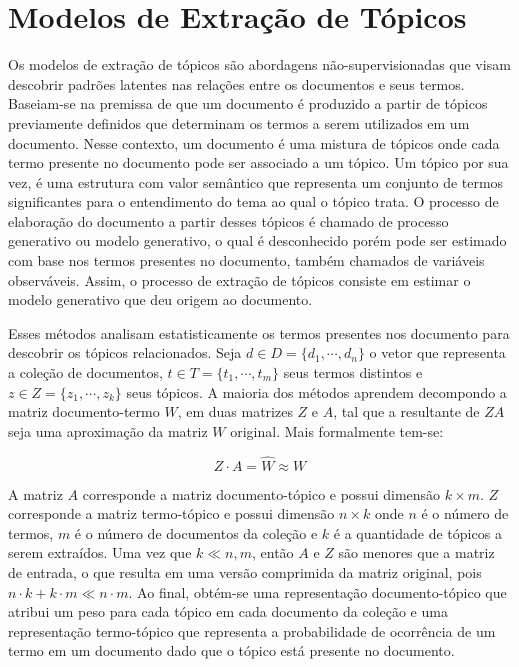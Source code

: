 \section{Modelos de Extração de Tópicos}



Os modelos de extração de tópicos são abordagens não-supervisionadas que visam descobrir padrões latentes nas relações entre os documentos e seus termos.  Baseiam-se na premissa de que um documento é produzido a partir de tópicos previamente definidos que determinam os termos a serem utilizados em um documento. Nesse contexto, um documento é uma mistura de tópicos onde cada termo presente no documento pode ser associado a um tópico. Um tópico por sua vez, é uma estrutura com valor semântico que representa um conjunto de termos significantes para o entendimento do tema ao qual o tópico trata. O processo de elaboração do documento a partir desses tópicos é chamado de processo generativo ou modelo generativo, o qual é desconhecido porém pode ser estimado com base nos termos presentes no documento, também chamados de variáveis observáveis. Assim, o processo de extração de tópicos consiste em estimar o modelo generativo que deu origem ao documento.







Esses métodos analisam estatisticamente os termos presentes nos documento para descobrir os tópicos relacionados. Seja 
$d \in D = \{d_1,\cdots,d_n\}$ o vetor que representa a coleção de documentos, 
$t \in T = \{t_1,\cdots,t_m\}$ seus termos distintos e 
$z \in Z = \{z_1,\cdots,z_k\}$ seus tópicos. 
A maioria dos métodos aprendem decompondo a matriz documento-termo $W$, em duas matrizes $Z$ e $A$, tal que a resultante de $ZA$ seja uma aproximação da matriz $W$ original. Mais formalmente tem-se:

\begin{equation}
	Z\cdot A = \hat{W} \approx W
\end{equation}

A matriz
$A$ corresponde a matriz documento-tópico e possui dimensão $k \times m$. $Z$ corresponde a matriz termo-tópico e possui dimensão $n \times k$ onde $n$ é o número de termos, $m$ é o número de documentos da coleção e $k$ é a quantidade de tópicos a serem extraídos.
Uma vez que $k \ll n,m$, então $A$ e $Z$ são menores que a matriz de entrada, o que resulta em uma versão comprimida da matriz original, pois $n \cdot k + k \cdot m \ll n \cdot m$.
% 
% 
Ao final, obtém-se uma representação documento-tópico que atribui um peso para cada tópico em cada documento da coleção e uma representação termo-tópico que representa a probabilidade de ocorrência de um termo em um documento dado que o tópico está presente no documento.

